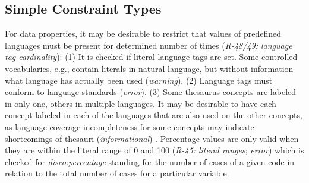 \documentclass{llncs}
\begin{document}

\subsection{Simple Constraint Types}

For data properties, it may be desirable to restrict that values of predefined languages must be present for determined number of times (\emph{R-48/49: language tag cardinality}):
(1) It is checked if literal language tags are set. Some controlled vocabularies, e.g., contain literals in natural language, but without information what language has actually been used (\emph{warning}). 
(2) Language tags must conform to language standards (\emph{error}). 
(3) Some thesaurus concepts are labeled in only one, others in multiple languages. 
It may be desirable to have each concept labeled in each of the languages that are also used on the other concepts,
as language coverage incompleteness for some concepts may indicate shortcomings of thesauri (\emph{informational})
\cite{MaderHaslhoferIsaac2012}.
Percentage values are only valid when they are within the literal range of 0 and 100 (\emph{R-45: literal ranges}; \emph{error})
which is checked for \emph{disco:percentage} standing for the number of cases of a given code in relation to the total number of cases for a particular variable.
\end{document}
